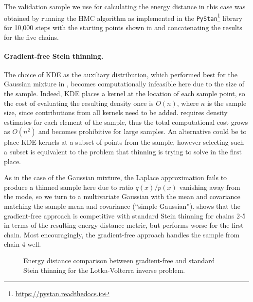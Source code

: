 \documentclass[11pt,a4paper]{report}
\begin{document}
The validation sample we use for calculating the energy distance in this case was obtained by running the HMC algorithm as implemented in the \texttt{PyStan}\footnote{\url{https://pystan.readthedocs.io}} library for 10,000 steps with the starting points shown in  and concatenating the results for the five chains.

\paragraph{Gradient-free Stein thinning.} The choice of KDE as the auxiliary distribution, which performed best for the Gaussian mixture in , becomes computationally infeasible here due to the size of the sample. Indeed, KDE places a kernel at the location of each sample point, so the cost of evaluating the resulting density once is $O(n)$, where $n$ is the sample size, since contributions from all kernels need to be added.  requires density estimates for each element of the sample, thus the total computational cost grows as $O(n^2)$ and becomes prohibitive for large samples. An alternative could be to place KDE kernels at a subset of points from the sample, however selecting such a subset is equivalent to the problem that thinning is trying to solve in the first place.

As in the case of the Gaussian mixture, the Laplace approximation fails to produce a thinned sample here due to ratio $q(x) / p(x)$ vanishing away from the mode, so we turn to a multivariate Gaussian with the mean and covariance matching the sample mean and covariance (``simple Gaussian'').  shows that the gradient-free approach is competitive with standard Stein thinning for chains 2-5 in terms of the resulting energy distance metric, but performs worse for the first chain. Most encouragingly, the gradient-free approach handles the sample from chain 4 well.

\begin{figure}[t]
\centering
{}
\caption{Energy distance comparison between gradient-free and standard Stein thinning for the Lotka-Volterra inverse problem.
\label{fig:lotka-volterra:gf-thinning:energy-distance}}
\end{figure}
\end{document}
